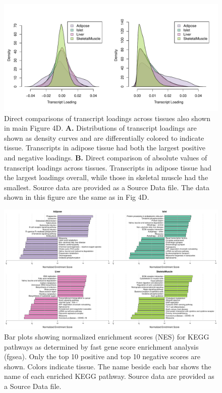 \documentclass[
]{article}
\begin{document}
\begin{figure}[ht!]
\includegraphics[width=\textwidth]{Figures/Supp_Fig_transcript_load_comparison.pdf} 
\caption{Direct comparisons of transcript loadings across tissues also shown
in main Figure 4D. \textbf{A.}
Distributions of transcript loadings are shown as density curves and are 
differentially colored to indicate tissue. Transcripts in adipose tissue had 
both the largest positive and negative loadings. \textbf{B.} Direct comparison
of absolute values of transcript loadings across tissues. Transcripts in adipose
tissue had the largest loadings overall, while those in skeletal muscle had the
smallest. Source data are provided as a Source Data file. The data shown in this
figure are the same as in Fig 4D.
}
\label{fig:transcript_loading_comparison}
\end{figure}

\begin{figure}[ht!]
\includegraphics[width=\textwidth]{Figures/Supp_Fig_enrichments_KEGG.pdf} 
\caption{Bar plots showing normalized enrichment scores (NES) for KEGG 
pathways as determined by fast gene score enrichment analysis (fgsea). 
Only the top 10 positive and top 10 negative scores are shown. Colors 
indicate tissue. The name beside each bar shows the name of each enriched 
KEGG pathway. Source data are provided as a Source Data file.
}
\label{fig:top_enrich_kegg}
\end{figure}
\end{document}
